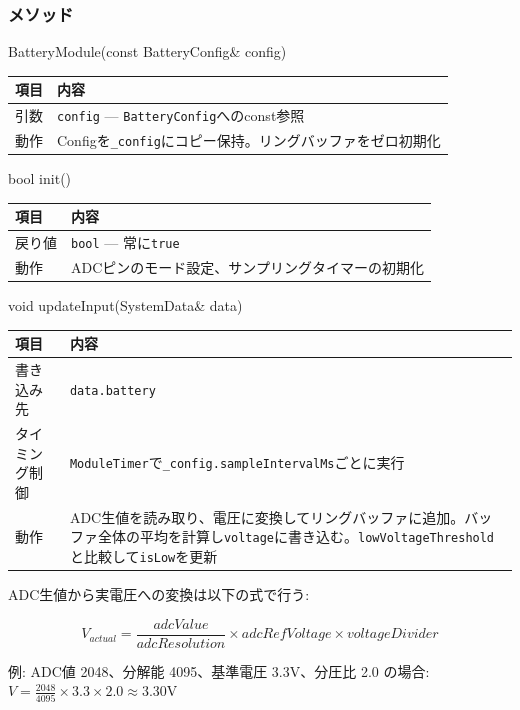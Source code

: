 \subsubsection{メソッド}

\begin{funcblock}{BatteryModule(const BatteryConfig\& config)}
\begin{tabularx}{\textwidth}{l X}
\toprule
\textbf{項目} & \textbf{内容} \\
\midrule
引数   & \texttt{config} --- \texttt{BatteryConfig}へのconst参照 \\
動作   & Configを\texttt{\_config}にコピー保持。リングバッファをゼロ初期化 \\
\bottomrule
\end{tabularx}
\end{funcblock}

\begin{funcblock}{bool init()}
\begin{tabularx}{\textwidth}{l X}
\toprule
\textbf{項目} & \textbf{内容} \\
\midrule
戻り値   & \texttt{bool} --- 常に\texttt{true} \\
動作     & ADCピンのモード設定、サンプリングタイマーの初期化 \\
\bottomrule
\end{tabularx}
\end{funcblock}

\begin{funcblock}{void updateInput(SystemData\& data)}
\begin{tabularx}{\textwidth}{l X}
\toprule
\textbf{項目} & \textbf{内容} \\
\midrule
書き込み先     & \texttt{data.battery} \\
タイミング制御 & \texttt{ModuleTimer}で\texttt{\_config.sampleIntervalMs}ごとに実行 \\
動作           & ADC生値を読み取り、電圧に変換してリングバッファに追加。バッファ全体の平均を計算し\texttt{voltage}に書き込む。\texttt{lowVoltageThreshold}と比較して\texttt{isLow}を更新 \\
\bottomrule
\end{tabularx}
\end{funcblock}

\begin{notebox}[電圧変換式]
ADC生値から実電圧への変換は以下の式で行う:

\vspace{0.3em}
$$V_{actual} = \frac{adcValue}{adcResolution} \times adcRefVoltage \times voltageDivider$$
\vspace{0.3em}

\noindent 例: ADC値 2048、分解能 4095、基準電圧 3.3V、分圧比 2.0 の場合:
$V = \frac{2048}{4095} \times 3.3 \times 2.0 \approx 3.30$V
\end{notebox}

